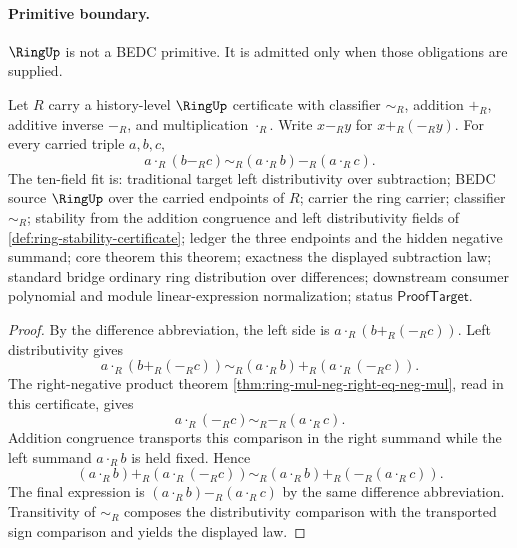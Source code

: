 \paragraph{Primitive boundary.}
\(\RingUp\) is not a BEDC primitive. It is admitted only when those obligations are supplied.

\begin{theorem}
\label{thm:ring-left-distributivity-over-subtraction}
Let $R$ carry a history-level $\RingUp$ certificate with classifier $\sim_R$,
addition $+_R$, additive inverse $-_R$, and multiplication $\cdot_R$. Write
$x-_R y$ for $x+_R(-_R y)$. For every carried triple $a,b,c$,
$$
a\cdot_R(b-_R c)\sim_R(a\cdot_R b)-_R(a\cdot_R c).
$$
The ten-field fit is: traditional target left distributivity over subtraction;
BEDC source $\RingUp$ over the carried endpoints of $R$; carrier the ring
carrier; classifier $\sim_R$; stability from the addition congruence and left
distributivity fields of \autoref{def:ring-stability-certificate}; ledger the
three endpoints and the hidden negative summand; core theorem this theorem;
exactness the displayed subtraction law; standard bridge ordinary ring
distribution over differences; downstream consumer polynomial and module
linear-expression normalization; status $\mathsf{ProofTarget}$.
\end{theorem}
\begin{proof}
By the difference abbreviation, the left side is
$a\cdot_R(b+_R(-_R c))$. Left distributivity gives
$$
a\cdot_R(b+_R(-_R c))
\sim_R
(a\cdot_R b)+_R(a\cdot_R(-_R c)).
$$
The right-negative product theorem
\autoref{thm:ring-mul-neg-right-eq-neg-mul}, read in this certificate, gives
$$
a\cdot_R(-_R c)\sim_R-_R(a\cdot_R c).
$$
Addition congruence transports this comparison in the right summand while the
left summand $a\cdot_R b$ is held fixed. Hence
$$
(a\cdot_R b)+_R(a\cdot_R(-_R c))
\sim_R
(a\cdot_R b)+_R(-_R(a\cdot_R c)).
$$
The final expression is $(a\cdot_R b)-_R(a\cdot_R c)$ by the same difference
abbreviation. Transitivity of $\sim_R$ composes the distributivity comparison
with the transported sign comparison and yields the displayed law.
\end{proof}

